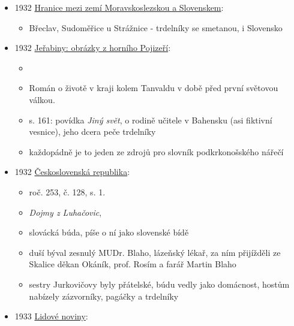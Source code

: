 \begin{itemize}
\begin{itemize}
    \begin{itemize}
    \tightlist
    \item
      Spiesskuchen = koláč pečený na rožni

      \begin{itemize}
      \tightlist
      \item
        takže neznali slovo, který použít
      \end{itemize}
    \end{itemize}
  \end{itemize}
\item
  1932
  \href{https://ceskadigitalniknihovna.cz/view/uuid:60ab056c-5ee1-43ab-9014-e91189880750?page=uuid\%3A31d79ba8-8100-11ed-8b6a-001b63bd97ba&fulltext=trd*&source=kfbz}{Hranice
  mezi zemí Moravskoslezskou a Slovenskem}:

  \begin{itemize}
  \tightlist
  \item
    Břeclav, Sudoměřice u Strážnice - trdelníky se smetanou, i Slovensko
  \end{itemize}
\item
  1932
  \href{https://www.digitalniknihovna.cz/mzk/uuid/uuid:ea5d2d20-0652-11e8-b1a1-005056827e52}{Jeřabiny:
  obrázky z horního Pojizeří}:

  \begin{itemize}
  \tightlist
  \item
  \item
    Román o životě v kraji kolem Tanvaldu v době před první světovou
    válkou.
  \item
    s. 161: povídka \emph{Jiný svět}, o rodině učitele v Bahensku (asi
    fiktivní vesnice), jeho dcera peče trdelníky
  \item
    každopádně je to jeden ze zdrojů pro slovník podkrkonošského nářečí
  \end{itemize}
\item
  1932
  \href{https://www.digitalniknihovna.cz/nacr/uuid/uuid:c6f9c7b4-b3f9-4181-b672-c60a20d8e6e9}{Československá
  republika}:

  \begin{itemize}
  \tightlist
  \item
    roč. 253, č. 128, s. 1.
  \item
    \emph{Dojmy z Luhačovic}, 
  \item
    slovácká búda, píše o ní jako slovenské bídě
  \item
    duší býval zesnulý MUDr. Blaho, lázeňský lékař, za ním přijížděli ze
    Skalice děkan Okáník, prof. Rosím a farář Martin Blaho
  \item
    sestry Jurkovičovy byly přátelské, búdu vedly jako domácnost, hostům
    nabízely zázvorníky, pagáčky a trdelníky
  \end{itemize}
\item
  1933
  \href{https://ceskadigitalniknihovna.cz/view/uuid:1026bc40-ea8b-11dc-9dcb-000d606f5dc6?page=uuid\%3Ac347cf40-31ff-4912-b767-a8cb9e4e8683&fulltext=trdeln*&source=nkp}{Lidové
  noviny}:


\end{itemize}
